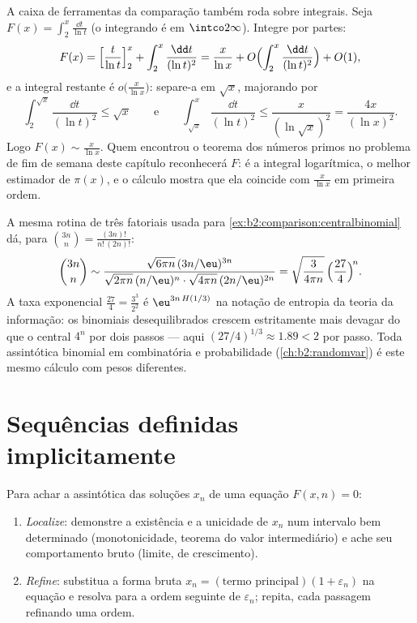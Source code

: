 \begin{example}\label{ex:b2:comparison:liworked}
A caixa de ferramentas da comparação também roda sobre integrais. Seja $F(x) =
\int_2^x\frac{\dd t}{\ln t}$ (o integrando é  em
$\intco2\infty$). Integre por partes:
\[
F(x) = \Bigl[\frac{t}{\ln t}\Bigr]_2^x +
\int_2^x\frac{\dd t}{(\ln t)^2}
= \frac{x}{\ln x} + O\Bigl(\int_2^x\frac{\dd t}{(\ln
t)^2}\Bigr) + O(1),
\]
e a integral restante é $o\bigl(\frac{x}{\ln x}\bigr)$:
separe-a em $\sqrt x$, majorando por
\[
\int_2^{\sqrt x}\frac{\dd t}{(\ln t)^2} \leq \sqrt x
\qquad\text{e}\qquad
\int_{\sqrt x}^{x}\frac{\dd t}{(\ln t)^2} \leq
\frac{x}{(\ln\sqrt x)^2} = \frac{4x}{(\ln x)^2} .
\]
Logo $F(x) \sim \frac{x}{\ln x}$. Quem encontrou o teorema dos
números primos no problema de fim de semana deste capítulo reconhecerá
$F$: é a integral logarítmica, o melhor estimador de
$\pi(x)$, e o cálculo mostra que ela coincide com
$\frac{x}{\ln x}$ em primeira ordem.
\end{example}

\begin{example}\label{ex:b2:comparison:lopsided}
A mesma rotina de três fatoriais usada para
\cref{ex:b2:comparison:centralbinomial} dá, para
$\binom{3n}{n} = \frac{(3n)!}{n!\,(2n)!}$:
\[
\binom{3n}{n} \sim
\frac{\sqrt{6\pi n}\,(3n/\eu)^{3n}}
{\sqrt{2\pi n}\,(n/\eu)^{n}\cdot\sqrt{4\pi n}\,(2n/\eu)^{2n}}
= \sqrt{\frac{3}{4\pi n}}\,
\Bigl(\frac{27}{4}\Bigr)^{\!n} .
\]
A taxa exponencial $\frac{27}4 = \frac{3^3}{2^2}$ é
$\eu^{3n\,H(1/3)}$ na notação de entropia da teoria
da informação: os binomiais desequilibrados crescem estritamente mais devagar do que o central
$4^n$ por dois passos --- aqui $(27/4)^{1/3} \approx 1.89 < 2$ por
passo. Toda assintótica binomial em combinatória e probabilidade
(\cref{ch:b2:randomvar}) é este mesmo cálculo com pesos
diferentes.
\end{example}

\section{Sequências definidas implicitamente}

\begin{method}\label{met:b2:comparison:implicit}
Para achar a assintótica das soluções $x_n$ de uma equação $F(x, n) =
0$:
\begin{enumerate}
  \item \emph{Localize}: demonstre a existência e a unicidade de $x_n$ num
        intervalo bem determinado (monotonicidade, teorema do valor
        intermediário) e ache seu comportamento bruto (limite,  de
        crescimento).
  \item \emph{Refine}: substitua a forma bruta $x_n = (\text{termo
        principal})(1 + \varepsilon_n)$ na equação e resolva para
        a ordem seguinte de $\varepsilon_n$; repita, cada passagem
        refinando uma ordem.
\end{enumerate}
\end{method}


